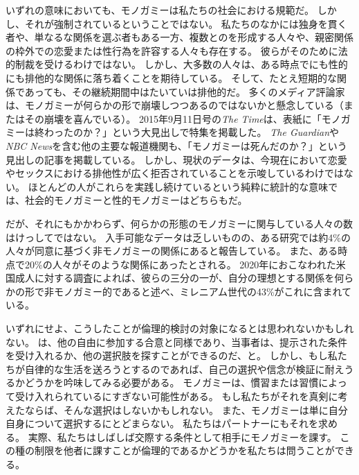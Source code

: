 \documentclass[paper=a4,book,openany]{jlreq}
\begin{document}
いずれの意味においても、モノガミーは私たちの社会における規範だ。
しかし、それが強制されているということではない。
私たちのなかには独身を貫く者や、単なるな関係を選ぶ者もある一方、複数とのを形成する人々や、親密関係の枠外での恋愛または性行為を許容する人々も存在する。
彼らがそのために法的制裁を受けるわけではない。
しかし、大多数の人々は、ある時点でにも性的にも排他的な関係に落ち着くことを期待している。
そして、たとえ短期的な関係であっても、その継続期間中はたいていは排他的だ。
多くのメディア評論家は、モノガミーが何らかの形で崩壊しつつあるのではないかと懸念している（またはその崩壊を喜んでいる）。
2015年9月11日号の\emph{The Time}は、表紙に「モノガミーは終わったのか？」という大見出しで特集を掲載した\citep{magazine15:_is_monog_over}。
\emph{The Guardian}や\emph{NBC News}を含む他の主要な報道機関も、「モノガミーは死んだのか？」という見出しの記事を掲載している\citep{alexander05:_is_monog_dead,jeffries12:_sex_issue}。
しかし、現状のデータは、今現在において恋愛やセックスにおける排他性が広く拒否されていることを示唆しているわけではない。
ほとんどの人がこれらを実践し続けているという純粋に統計的な意味では、社会的モノガミーと性的モノガミーはどちらもだ。

だが、それにもかかわらず、何らかの形態のモノガミーに関与している人々の数はけっしてではない。
入手可能なデータは乏しいものの、ある研究では約4\%の人々が同意に基づく非モノガミーの関係にあると報告している。
また、ある時点で20\%の人々がそのような関係にあったとされる\citep{haupert17:_preval_exper_consen_nonmon_relat}。
2020年におこなわれた米国成人に対する調査によれば、彼らの三分の一が、自分の理想とする関係を何らかの形で非モノガミー的であると述べ、ミレニアム世代の43\%がこれに含まれている\citep{ballard20:_millen_are_less_likel_want_monog_relat}。

いずれにせよ、こうしたことが倫理的検討の対象になるとは思われないかもしれない。
は、他の自由に参加する合意と同様であり、当事者は、提示された条件を受け入れるか、他の選択肢を探すことができるのだ、と。
しかし、もし私たちが自律的な生活を送ろうとするのであれば、自己の選択や信念が検証に耐えうるかどうかを吟味してみる必要がある。
モノガミーは、慣習または習慣によって受け入れられているにすぎない可能性がある。
もし私たちがそれを真剣に考えたならば、そんな選択はしないかもしれない。
また、モノガミーは単に自分自身について選択するにとどまらない。
私たちはパートナーにもそれを求める。
実際、私たちはしばしば交際する条件として相手にモノガミーを課す。
この種の制限を他者に課すことが倫理的であるかどうかを私たちは問うことができる。
\end{document}
